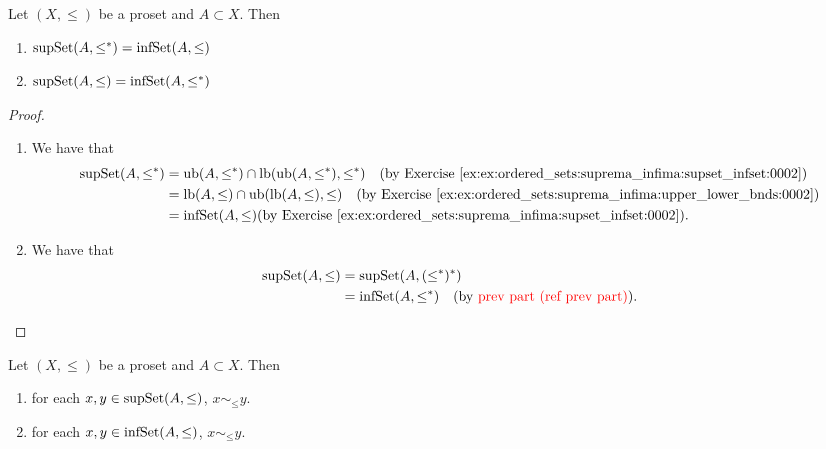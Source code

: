 \documentclass{book}
\begin{document}
	\begin{ex}  
		Let $(X, \leq)$ be a proset and $A \subset X$. Then 
		\begin{enumerate}
			\item $\operatorname{supSet}(A, \leq^*) = \operatorname{infSet}(A, \leq)$
			\item $\operatorname{supSet}(A, \leq) = \operatorname{infSet}(A, \leq^*)$
		\end{enumerate}
	\end{ex}
	
	\begin{proof}\
		\begin{enumerate}
			\item We have that
			\begin{align*}
				\supSet(A, \lop)
				& = \ubd (A, \lop) \cap \lbd (\ubd (A, \lop), \lop) \quad \text{(by \rex{ex:ordered_sets:suprema_infima:supset_infset:0002})} \\
				& = \lbd (A, \leq) \cap \ubd (\lbd (A, \leq), \leq) \quad \text{(by \rex{ex:ordered_sets:suprema_infima:upper_lower_bnds:0002})} \\
				& = \infSet(A, \leq) \text{(by \rex{ex:ordered_sets:suprema_infima:supset_infset:0002})}.
			\end{align*}
			\item We have that
			\begin{align*}
				\operatorname{supSet}(A, \leq)
				& = \operatorname{supSet}(A, (\leq^*)^*) \\
				& = \operatorname{infSet}(A, \leq^*) \quad \text{(by \textcolor{red}{prev part (ref prev part)})}.
			\end{align*}
		\end{enumerate}
		
		
		
	\end{proof}
	
	\begin{ex} 
		Let $(X, \leq)$ be a proset and $A \subset X$. Then
		\begin{enumerate}
			\item for each $x, y \in \operatorname{supSet} (A, \leq)$, $x \sim_{\leq} y$.
			\item for each $x,y \in \operatorname{infSet} (A, \leq)$, $x \sim_{\leq} y$.
		\end{enumerate}   
	\end{ex}
	
\end{document}
